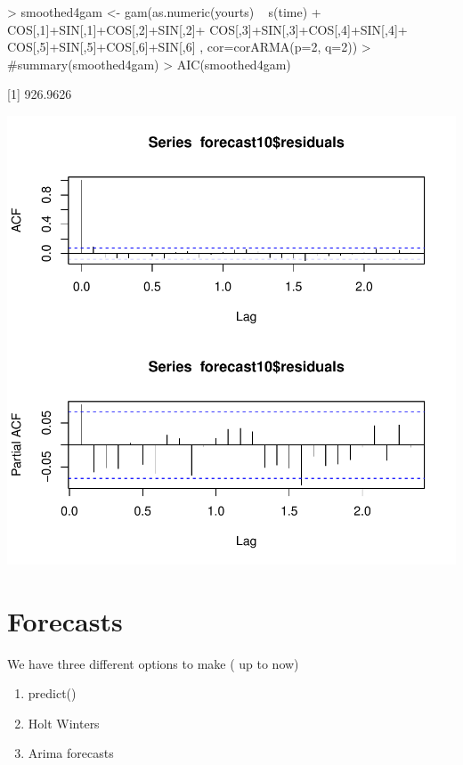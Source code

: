 \documentclass[11pt, a4paper]{article} %
\begin{document}
\begin{Schunk}
\begin{Sinput}
> smoothed4gam <- gam(as.numeric(yourts) ~ s(time)  +
                         COS[,1]+SIN[,1]+COS[,2]+SIN[,2]+
                         COS[,3]+SIN[,3]+COS[,4]+SIN[,4]+
                         COS[,5]+SIN[,5]+COS[,6]+SIN[,6]
                       , cor=corARMA(p=2, q=2))
> #summary(smoothed4gam)
> AIC(smoothed4gam)
\end{Sinput}
[1] 926.9626\end{Schunk}

\begin{Schunk}
\end{Schunk}
\includegraphics{alleselena-058}



\section{Forecasts}%
We have three different options to make ( up to now)
\begin{enumerate}
\item predict()
\item Holt Winters
\item Arima forecasts
\end{enumerate}
\end{document}
